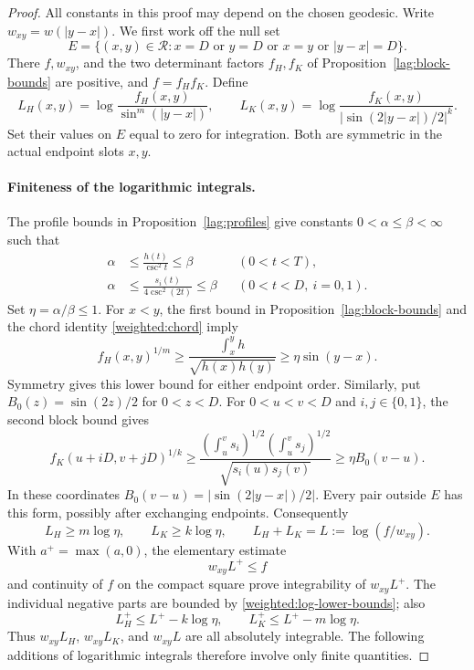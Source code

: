 \begin{proof}
All constants in this proof may depend on the chosen geodesic.
Write $w_{xy}=w(|y-x|)$.  We first work off the null set
\[
 E=\{(x,y)\in\mathcal R:
       x=D\text{ or }y=D\text{ or }x=y\text{ or }|y-x|=D\}.
\]
There $f,w_{xy}$, and the two determinant factors $f_H,f_K$ of
Proposition~\ref{lag:block-bounds} are positive, and $f=f_Hf_K$.  Define
\[
 L_H(x,y)=\log\frac{f_H(x,y)}{\sin^m(|y-x|)},\qquad
 L_K(x,y)=\log\frac{f_K(x,y)}{|\sin(2|y-x|)/2|^k}.
\]
Set their values on $E$ equal to zero for integration.
Both are symmetric in the actual endpoint slots $x,y$.

\paragraph{Finiteness of the logarithmic integrals.}
The profile bounds in Proposition~\ref{lag:profiles} give constants
$0<\alpha\leq\beta<\infty$ such that
\begin{align*}
 \alpha&\leq\frac{h(t)}{\csc^2t}\leq\beta
 &&(0<t<T),\\
 \alpha&\leq\frac{s_i(t)}{4\csc^2(2t)}\leq\beta
 &&(0<t<D,\ i=0,1).
\end{align*}
Set $\eta=\alpha/\beta\leq1$.
For $x<y$, the first bound in Proposition~\ref{lag:block-bounds} and the chord
identity \eqref{weighted:chord} imply
\[
 f_H(x,y)^{1/m}
 \geq\frac{\int_x^y h}{\sqrt{h(x)h(y)}}
 \geq\eta\sin(y-x).
\]
Symmetry gives this lower bound for either endpoint order.
Similarly, put $B_0(z)=\sin(2z)/2$ for $0<z<D$.
For $0<u<v<D$ and $i,j\in\{0,1\}$, the second block bound gives
\[
 f_K(u+iD,v+jD)^{1/k}
 \geq\frac{(\int_u^v s_i)^{1/2}(\int_u^v s_j)^{1/2}}
              {\sqrt{s_i(u)s_j(v)}}
 \geq\eta B_0(v-u).
\]
In these coordinates
$B_0(v-u)=|\sin(2|y-x|)/2|$.  Every pair outside $E$ has this form,
possibly after exchanging endpoints.  Consequently
\begin{equation}
 L_H\geq m\log\eta,
 \qquad L_K\geq k\log\eta,
 \qquad L_H+L_K=L:=\log(f/w_{xy}).
 \label{weighted:log-lower-bounds}
\end{equation}
With $a^+=\max(a,0)$, the elementary estimate
\[
 w_{xy}L^+\leq f
\]
and continuity of $f$ on the compact square prove integrability of
$w_{xy}L^+$.  The individual negative parts are bounded by
\eqref{weighted:log-lower-bounds}; also
\[
 L_H^+\leq L^+-k\log\eta,\qquad
 L_K^+\leq L^+-m\log\eta.
\]
Thus $w_{xy}L_H$, $w_{xy}L_K$, and $w_{xy}L$ are all absolutely
integrable.  The following additions of logarithmic integrals therefore
involve only finite quantities.


\end{proof}
